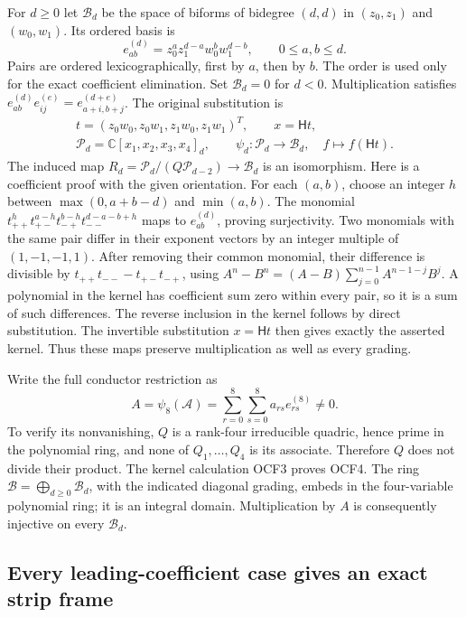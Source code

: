 \documentclass[11pt,a4paper]{article}
\begin{document}
For $d\geq0$ let $\mathcal B_d$ be the space of biforms of
bidegree $(d,d)$ in $(z_0,z_1)$ and $(w_0,w_1)$. Its ordered basis is
\[
 e_{ab}^{(d)}=z_0^a z_1^{d-a}w_0^b w_1^{d-b},
 \qquad 0\leq a,b\leq d.
 \tag{OCF2}
\]
Pairs are ordered lexicographically, first by $a$, then by $b$.
The order is used only for the exact coefficient elimination.
Set $\mathcal B_d=0$ for $d<0$. Multiplication satisfies
$e_{ab}^{(d)}e_{ij}^{(e)}=e_{a+i,b+j}^{(d+e)}$.
The original substitution is
\[
 \begin{gathered}
 t=(z_0w_0,z_0w_1,z_1w_0,z_1w_1)^T,\qquad x=\mathsf Ht,\\
 \mathscr P_d=\mathbb C[x_1,x_2,x_3,x_4]_d,\qquad
 \psi_d:\mathscr P_d\longrightarrow\mathcal B_d,\quad
 f\longmapsto f(\mathsf Ht).
 \end{gathered}\tag{OCF3}
\]
The induced map
$R_d=\mathscr P_d/(Q\mathscr P_{d-2})\longrightarrow\mathcal B_d$
is an isomorphism. Here is a coefficient proof with the given
orientation. For each $(a,b)$, choose an integer
$h$ between $\max(0,a+b-d)$ and $\min(a,b)$. The monomial
$t_{++}^{h}t_{+-}^{a-h}t_{-+}^{b-h}t_{--}^{d-a-b+h}$ maps
to $e_{ab}^{(d)}$, proving surjectivity. Two monomials with
the same pair differ in their exponent vectors by an integer
multiple of $(1,-1,-1,1)$. After removing their common monomial,
their difference is divisible by $t_{++}t_{--}-t_{+-}t_{-+}$,
using $A^n-B^n=(A-B)\sum_{j=0}^{n-1}A^{n-1-j}B^j$.
A polynomial in the kernel has coefficient sum zero within every
pair, so it is a sum of such differences. The reverse inclusion
in the kernel follows by direct substitution. The invertible
substitution $x=\mathsf Ht$ then gives exactly the asserted kernel.
Thus these maps preserve multiplication as well as every grading.

Write the full conductor restriction as
\[
 A=\psi_8(\mathcal A)
     =\sum_{r=0}^8\sum_{s=0}^8 a_{rs}e_{rs}^{(8)}\ne0.
 \tag{OCF4}
\]
To verify its nonvanishing, $Q$ is a rank-four irreducible quadric,
hence prime in the polynomial ring, and none of $Q_1,\ldots,Q_4$
is its associate. Therefore $Q$ does not divide their product.
The kernel calculation OCF3 proves OCF4. The ring
$\mathcal B=\bigoplus_{d\geq0}\mathcal B_d$, with the indicated
diagonal grading, embeds in the four-variable polynomial ring;
it is an integral domain. Multiplication by $A$ is consequently
injective on every $\mathcal B_d$.

\subsection{Every leading-coefficient case gives an exact strip frame}
\end{document}
